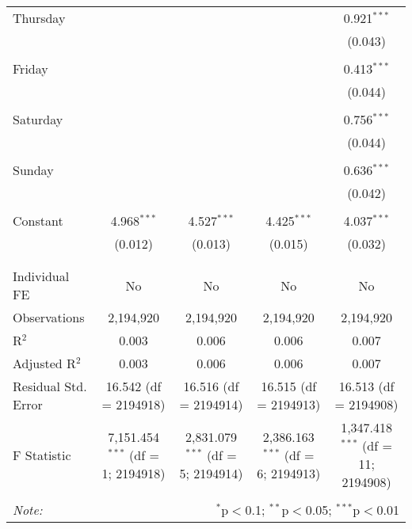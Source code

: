 \documentclass[
]{article}
\begin{document}
\begin{table}[!htbp]
{\begin{tabular}{@{\extracolsep{5pt}}lcccc}
 Thursday &  &  &  & 0.921$^{***}$ \\ 
  &  &  &  & (0.043) \\ 
  & & & & \\ 
 Friday &  &  &  & 0.413$^{***}$ \\ 
  &  &  &  & (0.044) \\ 
  & & & & \\ 
 Saturday &  &  &  & 0.756$^{***}$ \\ 
  &  &  &  & (0.044) \\ 
  & & & & \\ 
 Sunday &  &  &  & 0.636$^{***}$ \\ 
  &  &  &  & (0.042) \\ 
  & & & & \\ 
 Constant & 4.968$^{***}$ & 4.527$^{***}$ & 4.425$^{***}$ & 4.037$^{***}$ \\ 
  & (0.012) & (0.013) & (0.015) & (0.032) \\ 
  & & & & \\ 
\hline \\[-1.8ex] 
Individual FE & No & No & No & No \\ 
Observations & 2,194,920 & 2,194,920 & 2,194,920 & 2,194,920 \\ 
R$^{2}$ & 0.003 & 0.006 & 0.006 & 0.007 \\ 
Adjusted R$^{2}$ & 0.003 & 0.006 & 0.006 & 0.007 \\ 
Residual Std. Error & 16.542 (df = 2194918) & 16.516 (df = 2194914) & 16.515 (df = 2194913) & 16.513 (df = 2194908) \\ 
F Statistic & 7,151.454$^{***}$ (df = 1; 2194918) & 2,831.079$^{***}$ (df = 5; 2194914) & 2,386.163$^{***}$ (df = 6; 2194913) & 1,347.418$^{***}$ (df = 11; 2194908) \\ 
\hline 
\hline \\[-1.8ex] 
\textit{Note:}  & \multicolumn{4}{r}{$^{*}$p$<$0.1; $^{**}$p$<$0.05; $^{***}$p$<$0.01} \\ 
\end{tabular}
} 
\end{table} 
\newpage
\end{document}

